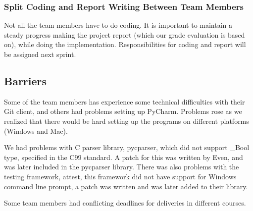 \subsubsection{Split Coding and Report Writing Between Team Members} 
Not all the team members have to do coding. It is important to maintain a
steady progress making the project report (which our grade evaluation is based
on), while doing the implementation. Responsibilities for coding and report
will be assigned next sprint. 

\subsection{Barriers}
Some of the team members has experience some technical difficulties with their
Git client, and others had problems setting up PyCharm. Problems rose as we
realized that there would be hard setting up the programs on different
platforms (Windows and Mac).

We had problems with C parser library, pycparser, which did not support \_Bool
type, specified in the C99 standard. A patch for this was written by Even, and
was later included in the pycparser library. There was also problems with the
testing framework, attest, this framework did not have support for Windows
command line prompt, a patch was written and was later added to their library.

Some team members had conflicting deadlines for deliveries in different courses.

